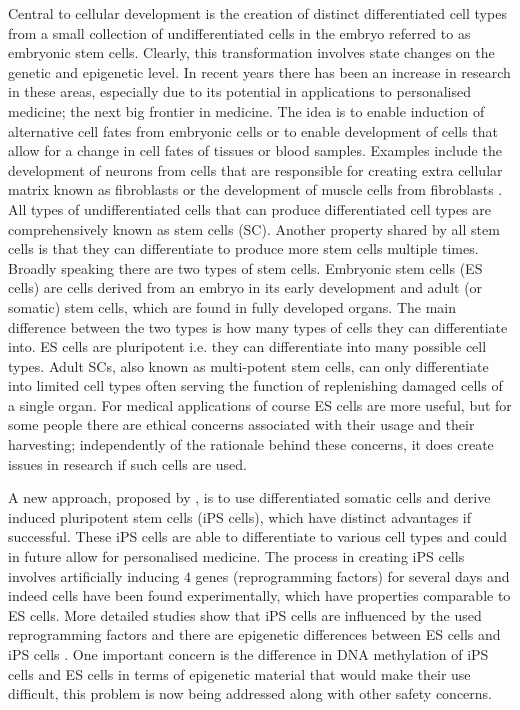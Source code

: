 Central to cellular development is the creation of distinct differentiated cell types from a small collection of undifferentiated cells in the embryo referred to as embryonic stem cells. Clearly, this transformation involves state changes on the genetic and epigenetic level. In recent years there has been an increase in research in these areas, especially due to its potential in applications to personalised medicine; the next big frontier in medicine. The idea is to enable induction of alternative cell fates from embryonic cells or to enable development of cells that allow for a change in cell fates of tissues or blood samples. Examples include the development of neurons from cells that are responsible for creating extra cellular matrix known as fibroblasts \citep{Vierbuchen:2010fa, Pang:2011ce} or the development of muscle cells from fibroblasts \citep{Ieda:2010ir, Efe:2011bpa}. All types of undifferentiated cells that can produce differentiated cell types are comprehensively known as stem cells (SC). Another property shared by all stem cells is that they can differentiate to produce more stem cells multiple times. Broadly speaking there are two types of stem cells. Embryonic stem cells (ES cells) are cells derived from an embryo in its early development and  adult (or somatic) stem cells, which are found in fully developed organs. The main difference between the two types is how many types of cells they can differentiate into. ES cells are pluripotent i.e. they can differentiate into many possible cell types. Adult SCs, also known as multi-potent stem cells, can only differentiate into limited cell types often serving the function of replenishing damaged cells of a single organ. For medical applications of course ES cells are more useful, but for some people there are ethical concerns associated with their usage and their harvesting; independently of the rationale behind these concerns, it does create issues in research if such cells are used.

A new approach, proposed by \cite{Takahashi:2006hi}, is to use differentiated somatic cells and derive induced pluripotent stem cells (iPS cells), which have distinct advantages if successful. These iPS cells are able to differentiate to various cell types and could in future allow for personalised medicine. The process in creating iPS cells involves artificially inducing $4$ genes (reprogramming factors) for several days and indeed cells have been found experimentally, which have properties comparable to ES cells. More detailed studies show that iPS cells are influenced by the used reprogramming factors and there are epigenetic differences between ES cells and iPS cells \citep{Carey:2011bs, Bock:2011kx}. One important concern is the difference in DNA methylation of iPS cells and ES cells in terms of epigenetic material that would make their use difficult, this problem is now being addressed \citep{Bagci:2013ey} along with other safety concerns.

